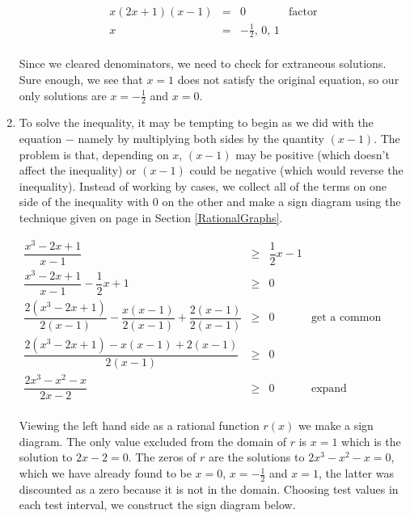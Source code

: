 \documentclass{ximera}
\begin{document}
\begin{example}
\begin{enumerate}
\[\begin{array}{rclr}
x(2x+1)(x-1) & = & 0 & \text{factor}\\

x & = & -\frac{1}{2}, \, 0, \, 1 & \\


\end{array}\]

Since we cleared denominators, we need to check for extraneous solutions.  Sure enough, we see that $x=1$ does not satisfy the original equation, so  our only solutions are $x=-\frac{1}{2}$ and $x=0$.

\item  To solve the inequality, it may be tempting to begin as we did with the equation $-$ namely by multiplying both sides by the quantity $(x-1)$.  The problem is that, depending on $x$, $(x-1)$ may be positive (which doesn't affect the inequality) or $(x-1)$ could be negative (which would reverse the inequality).  Instead of working by cases, we collect all of the terms on one side of the inequality with $0$ on the other and make a sign diagram using the technique given on page \pageref{rationalsigndiagram} in Section \ref{RationalGraphs}.

\[ \begin{array}{rclr}

\dfrac{x^3-2x+1}{x-1} & \geq & \dfrac{1}{2}x-1 & \\ [10pt]

\dfrac{x^3-2x+1}{x-1}  - \dfrac{1}{2} x + 1& \geq & 0& \\ [10pt]

\dfrac{2 \left(x^3-2x+1\right)}{2(x-1)}  - \dfrac{x(x-1)}{2(x-1)} + \dfrac{2(x-1)}{2(x-1)}& \geq & 0&\text{get a common denominator} \\ [10pt]

\dfrac{2\left(x^3-2x+1\right)-x(x-1)+2(x-1)}{2(x-1)} & \geq & 0 & \\ [10pt]

\dfrac{2x^3-x^2-x}{2x-2} & \geq & 0 & \text{expand} \\

\end{array} \]

Viewing the left hand side as a rational function $r(x)$ we make a sign diagram.  The only value excluded from the domain of $r$ is $x=1$ which is the solution to $2x-2=0$.  The zeros of $r$ are the solutions to $2x^3-x^2-x=0$, which we have already found to be $x=0$, $x=-\frac{1}{2}$ and $x=1$, the latter was discounted as a zero because it is not in the domain.  Choosing test values in each test interval, we construct the sign diagram below. 


\end{enumerate}
\end{example}
\end{document}
